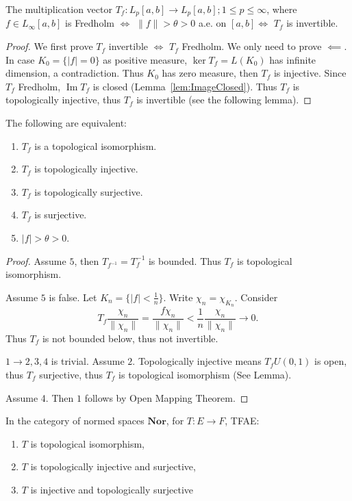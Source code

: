 \begin{proposition}
	\label{prop:LpMultFredholm}
	The multiplication vector $T_f: L_p[a,b] \to L_p[a,b]; 1 \le p \le \infty $, where $f \in L_\infty [a,b]$ is Fredholm $\iff $ $\|f\| > \theta > 0$ a.e. on $[a,b]  \iff $ $T_f$ is invertible.
\end{proposition}
\begin{proof}
	We first prove $T_f$ invertible $\iff $ $T_f$ Fredholm. We only need to prove $\impliedby$. In case $K_0 = \{|f| = 0\} $ as positive measure, $\operatorname{ker} T_f = L(K_0)$ has infinite dimension, a contradiction. Thus $K_0$ has zero measure, then $T_f$ is injective. Since $T_f$ Fredholm, $\operatorname{Im} T_f$ is closed (Lemma~\ref{lem:ImageClosed}). Thus $T_f$ is topologically injective, thus $T_f$ is invertible (see the following lemma). 
\end{proof}

\begin{lemma}
	The following are equivalent:
	\begin{enumerate}
		\item $T_f$ is a topological isomorphism.
		\item $T_f$ is topologically injective.
		\item $T_f$ is topologically surjective.
		\item $T_f$ is surjective.
		\item $|f| > \theta > 0$.
	\end{enumerate}
\end{lemma}
\begin{proof}
	Assume $5$, then $T_{f^{-1}} = T_f^{-1}$ is bounded. Thus $T_f$ is topological isomorphism.

	Assume $5$ is false. Let $K_n = \{|f| < \frac{1}{n}\} $. Write $\chi_n = \chi_{K_n}$. Consider
	\[
		T_f \frac{\chi_n}{\|\chi_n\|} = \frac{f \chi_n}{ \|\chi_n\|} < \frac{1}{n} \frac{\chi_n}{\|\chi_n\|} \to 0
	.\] 
	Thus $T_f$ is not bounded below, thus not invertible.

	$1 \to 2, 3, 4$ is trivial. Assume $2$. Topologically injective means $T_f U(0,1)$ is open, thus $T_f$ surjective, thus $T_f$ is topological isomorphism (See Lemma).

	Assume 4. Then $1$ follows by Open Mapping Theorem.
\end{proof}

\begin{lemma}
	\label{lem:TopInjectiveSurjective}
	In the category of normed spaces $\mathbf{Nor}$, for $T:E \to F$, TFAE:
	\begin{enumerate}
		\item $T$ is topological isomorphism,
		\item $T$ is topologically injective and surjective,
		\item $T$ is injective and topologically surjective
	\end{enumerate}
\end{lemma}

